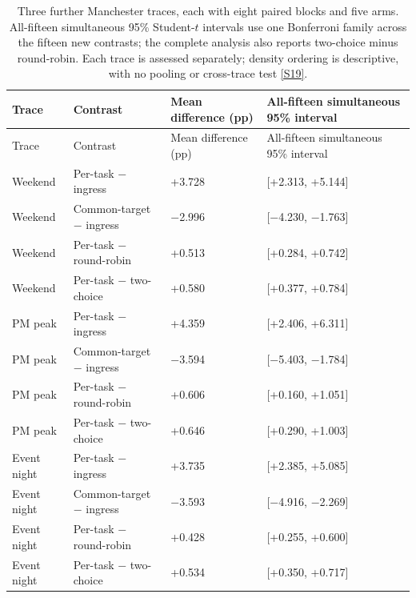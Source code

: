 \documentclass[12pt,a4paper]{article}
\begin{document}
\begingroup
\singlespacing\footnotesize\setlength{\tabcolsep}{3pt}
\begin{xltabular}{\textwidth}{@{}YYYY@{}}
\caption[Three-trace simultaneous contrasts]{Three further Manchester traces, each with eight paired blocks and five arms. All-fifteen simultaneous 95\% Student-$t$ intervals use one Bonferroni family across the fifteen new contrasts; the complete analysis also reports two-choice minus round-robin. Each trace is assessed separately; density ordering is descriptive, with no pooling or cross-trace test \hyperref[source-s19]{[S19]}.}\label{tab:7b} \\
\toprule
Trace & Contrast & Mean difference (pp) & All-fifteen simultaneous 95\% interval \\
\midrule\endfirsthead
\toprule
Trace & Contrast & Mean difference (pp) & All-fifteen simultaneous 95\% interval \\
\midrule\endhead
\bottomrule\endfoot
Weekend & Per-task \ensuremath{-} ingress & +3.728 & [+2.313, +5.144] \\
Weekend & Common-target \ensuremath{-} ingress & \ensuremath{-}2.996 & [\ensuremath{-}4.230, \ensuremath{-}1.763] \\
Weekend & Per-task \ensuremath{-} round-robin & +0.513 & [+0.284, +0.742] \\
Weekend & Per-task \ensuremath{-} two-choice & +0.580 & [+0.377, +0.784] \\
PM peak & Per-task \ensuremath{-} ingress & +4.359 & [+2.406, +6.311] \\
PM peak & Common-target \ensuremath{-} ingress & \ensuremath{-}3.594 & [\ensuremath{-}5.403, \ensuremath{-}1.784] \\
PM peak & Per-task \ensuremath{-} round-robin & +0.606 & [+0.160, +1.051] \\
PM peak & Per-task \ensuremath{-} two-choice & +0.646 & [+0.290, +1.003] \\
Event night & Per-task \ensuremath{-} ingress & +3.735 & [+2.385, +5.085] \\
Event night & Common-target \ensuremath{-} ingress & \ensuremath{-}3.593 & [\ensuremath{-}4.916, \ensuremath{-}2.269] \\
Event night & Per-task \ensuremath{-} round-robin & +0.428 & [+0.255, +0.600] \\
Event night & Per-task \ensuremath{-} two-choice & +0.534 & [+0.350, +0.717] \\
\end{xltabular}
\endgroup
\end{document}
